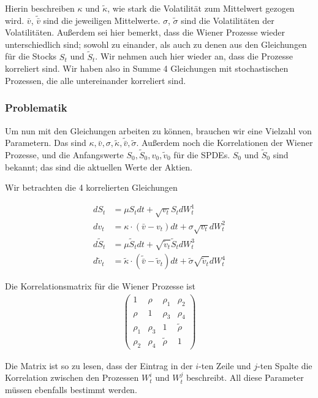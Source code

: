 \documentclass[12pt]{article}
\begin{document}
Hierin beschreiben $\kappa$ und $\tilde{\kappa}$, wie stark die Volatilität zum Mittelwert gezogen wird. $\bar{v}$, $\tilde{\bar{v}}$ sind die jeweiligen Mittelwerte. $\sigma$, $\tilde{\sigma}$ sind die Volatilitäten der Volatilitäten. Außerdem sei hier bemerkt, dass die Wiener Prozesse wieder unterschiedlich sind; sowohl zu einander, als auch zu denen aus den Gleichungen für die Stocks $S_t$ und $\tilde{S}_t$. Wir nehmen auch hier wieder an, dass die Prozesse korreliert sind. Wir haben also in Summe 4 Gleichungen mit stochastischen Prozessen, die alle untereinander korreliert sind.


\subsubsection{Problematik}

Um nun mit den Gleichungen arbeiten zu können, brauchen wir eine Vielzahl von Parametern. Das sind $\kappa, \bar{v}, \sigma, \tilde{\kappa}, \tilde{\bar{v}}, \tilde{\sigma}$. Außerdem noch die Korrelationen der Wiener Prozesse, und die Anfangswerte $S_0, \tilde{S}_0, v_0, \tilde{v}_0$ für die SPDEs. $S_0$ und $\tilde{S}_0$ sind bekannt; das sind die aktuellen Werte der Aktien.

Wir betrachten die 4 korrelierten Gleichungen

\begin{align} \label{SPDE}
dS_t &= \mu S_t dt + \sqrt{v_t} S_t dW^1_t \\
dv_t &= \kappa\cdot(\bar{v}-v_t) dt + \sigma \sqrt{v_t}dW^2_t \\
d\tilde{S}_t &= \mu \tilde{S}_t dt + \sqrt{\tilde{v}_t} \tilde{S}_t dW^3_t \\
d\tilde{v}_t &= \tilde{\kappa}\cdot(\tilde{\bar{v}}-\tilde{v}_t) dt + \tilde{\sigma} \sqrt{\tilde{v}_t}dW^4_t
\end{align}

Die Korrelationsmatrix für die Wiener Prozesse ist
\begin{align} \label{korrel}
\left(
\begin{matrix}
1& \rho& \rho_1& \rho_2\\
\rho& 1& \rho_3& \rho_4\\
\rho_1& \rho_3& 1& \tilde{\rho}\\
\rho_2& \rho_4& \tilde{\rho}& 1
\end{matrix}
\right)
\end{align}

Die Matrix ist so zu lesen, dass der Eintrag in der $i$-ten Zeile und $j$-ten Spalte die Korrelation zwischen den Prozessen $W^i_t$ und $W^j_t$ beschreibt. All diese Parameter müssen ebenfalls bestimmt werden.
\end{document}
